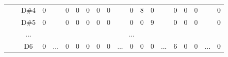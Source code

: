\documentclass[12pt]{article}
\begin{document}
\begin{table}[!ht]
{\begin{tabular}{clcccccccccccccccccc}
                       & \multicolumn{1}{l|}{} & \multicolumn{1}{c|}{D\#4} & \multicolumn{1}{c|}{0}    & \multicolumn{1}{c|}{}                     & \multicolumn{1}{c|}{0}    & \multicolumn{1}{c|}{0}    & \multicolumn{1}{c|}{0}    & \multicolumn{1}{c|}{0}    & \multicolumn{1}{c|}{0}  & \multicolumn{1}{c|}{}                     & \multicolumn{1}{c|}{0}    & \multicolumn{1}{c|}{8}    & \multicolumn{1}{c|}{0}    & \multicolumn{1}{c|}{}                     & \multicolumn{1}{c|}{0}  & \multicolumn{1}{c|}{0}  & \multicolumn{1}{c|}{0}  & \multicolumn{1}{c|}{}                     & \multicolumn{1}{c|}{0}  \\ \cline{3-4} \cline{6-10} \cline{12-14} \cline{16-18} \cline{20-20} 
                       & \multicolumn{1}{l|}{} & \multicolumn{1}{c|}{D\#5} & \multicolumn{1}{c|}{0}    & \multicolumn{1}{c|}{}                     & \multicolumn{1}{c|}{0}    & \multicolumn{1}{c|}{0}    & \multicolumn{1}{c|}{0}    & \multicolumn{1}{c|}{0}    & \multicolumn{1}{c|}{0}  & \multicolumn{1}{c|}{}                     & \multicolumn{1}{c|}{0}    & \multicolumn{1}{c|}{0}    & \multicolumn{1}{c|}{9}    & \multicolumn{1}{c|}{}                     & \multicolumn{1}{c|}{0}  & \multicolumn{1}{c|}{0}  & \multicolumn{1}{c|}{0}  & \multicolumn{1}{c|}{}                     & \multicolumn{1}{c|}{0}  \\ \cline{3-4} \cline{6-10} \cline{12-14} \cline{16-18} \cline{20-20} 
                       & \multicolumn{1}{l|}{} & \multicolumn{1}{c|}{...}  & \multicolumn{17}{c|}{...}                                                                                                                                                                                                                                                                                                                                                                                                                                                                                                                       \\ \cline{3-4} \cline{6-10} \cline{12-14} \cline{16-18} \cline{20-20} 
                       & \multicolumn{1}{l|}{} & \multicolumn{1}{c|}{D6}   & \multicolumn{1}{c|}{0}    & \multicolumn{1}{c|}{\multirow{6}{*}{...}} & \multicolumn{1}{c|}{0}    & \multicolumn{1}{c|}{0}    & \multicolumn{1}{c|}{0}    & \multicolumn{1}{c|}{0}    & \multicolumn{1}{c|}{0}  & \multicolumn{1}{c|}{\multirow{6}{*}{...}} & \multicolumn{1}{c|}{0}    & \multicolumn{1}{c|}{0}    & \multicolumn{1}{c|}{0}    & \multicolumn{1}{c|}{\multirow{6}{*}{...}} & \multicolumn{1}{c|}{6}  & \multicolumn{1}{c|}{0}  & \multicolumn{1}{c|}{0}  & \multicolumn{1}{c|}{\multirow{6}{*}{...}} & \multicolumn{1}{c|}{0}  \\ \cline{3-4} \cline{6-10} \cline{12-14} \cline{16-18} \cline{20-20} 

\end{tabular}}
\end{table}
\end{document}
